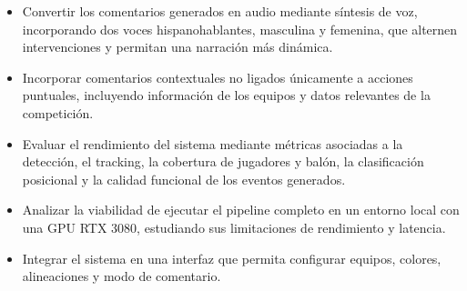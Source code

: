 \begin{itemize}
    \item Convertir los comentarios generados en audio mediante síntesis de voz, incorporando dos voces hispanohablantes, masculina y femenina, que alternen intervenciones y permitan una narración más dinámica.

    \item Incorporar comentarios contextuales no ligados únicamente a acciones puntuales, incluyendo información de los equipos y datos relevantes de la competición.

    \item Evaluar el rendimiento del sistema mediante métricas asociadas a la detección, el tracking, la cobertura de jugadores y balón, la clasificación posicional y la calidad funcional de los eventos generados.

    \item Analizar la viabilidad de ejecutar el pipeline completo en un entorno local con una GPU RTX 3080, estudiando sus limitaciones de rendimiento y latencia.

    \item Integrar el sistema en una interfaz que permita configurar equipos, colores, alineaciones y modo de comentario.
\end{itemize}